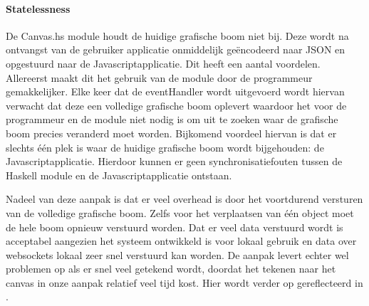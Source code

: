 \paragraph{Statelessness} \label{par:statelessness}
De Canvas.hs module houdt de huidige grafische boom niet bij. Deze wordt na ontvangst van de gebruiker applicatie onmiddelijk geëncodeerd naar JSON en opgestuurd naar de Javascriptapplicatie. Dit heeft een aantal voordelen. Allereerst maakt dit het gebruik van de module door de programmeur gemakkelijker. Elke keer dat de eventHandler wordt uitgevoerd wordt hiervan verwacht dat deze een volledige grafische boom oplevert waardoor het voor de programmeur en de module niet nodig is om uit te zoeken waar de grafische boom precies veranderd moet worden. Bijkomend voordeel hiervan is dat er slechts één plek is waar de huidige grafische boom wordt bijgehouden: de Javascriptapplicatie. Hierdoor kunnen er geen synchronisatiefouten tussen de Haskell module en de Javascriptapplicatie ontstaan. 

Nadeel van deze aanpak is dat er veel overhead is door het voortdurend versturen van de volledige grafische boom. Zelfs voor het verplaatsen van één object moet de hele boom opnieuw verstuurd worden. Dat er veel data verstuurd wordt is acceptabel aangezien het systeem ontwikkeld is voor lokaal gebruik en data over websockets lokaal zeer snel verstuurd kan worden. De aanpak levert echter wel problemen op als er snel veel getekend wordt, doordat het tekenen naar het canvas in onze aanpak relatief veel tijd kost. Hier wordt verder op gereflecteerd in .
